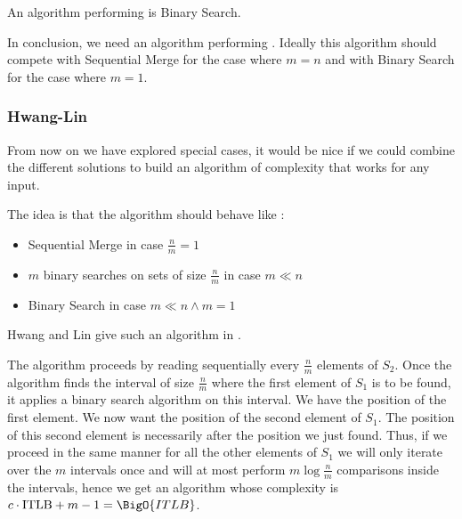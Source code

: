 An algorithm performing  is Binary Search.


In conclusion, we need an algorithm performing .
Ideally this algorithm should compete with Sequential Merge for the case where
$m = n$ and with Binary Search for the case where $m = 1$.


\subsubsection{Hwang-Lin}

From now on we have explored special cases, it would be nice if we could
combine the different solutions to build an algorithm of complexity  that works for any input.

The idea is that the algorithm should behave like :

\begin{itemize}
\item Sequential Merge in case $\frac{n}{m} = 1$
\item $m$ binary searches on sets of size $\frac{n}{m}$ in case $m \ll n$
\item Binary Search in case $m \ll n \land m = 1$
\end{itemize}

Hwang and Lin give such an algorithm in \cite{DBLP:journals/siamcomp/HwangL72}.

The algorithm proceeds by reading sequentially every $\frac{n}{m}$ elements of
$S_2$. Once the algorithm finds the interval of size $\frac{n}{m}$ where the
first element of $S_1$ is to be found, it applies a binary search algorithm on
this interval. We have the position of the first element.
We now want the position of the second element of $S_1$. The position of this
second element is necessarily after the position we just found. Thus, if we
proceed in the same manner for all the other elements of $S_1$ we will only
iterate over the $m$ intervals once and will at most perform $m
\log\frac{n}{m}$ comparisons inside the intervals, hence we get an algorithm
whose complexity is $c \cdot \text{ITLB} + m - 1 = \BigO{ITLB}$.

